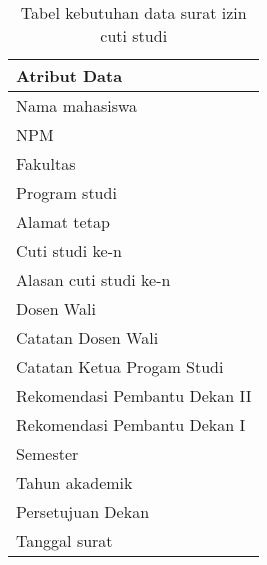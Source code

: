 \begin{table}[H]
\centering
\caption{Tabel kebutuhan data surat izin cuti studi}
\label{surat_izin_cuti_studi}
\begin{tabular}{|l|}
\hline
{\textbf{Atribut Data}}                     \\ \hline
Nama mahasiswa                            \\ \hline 
NPM                                       \\ \hline 
Fakultas                                  \\ \hline 
Program studi                             \\ \hline 
Alamat tetap                              \\ \hline
Cuti studi ke-n   			            \\ \hline 
Alasan cuti studi ke-n                    \\ \hline
Dosen Wali				                \\ \hline 
Catatan Dosen Wali                        \\ \hline
Catatan Ketua Progam Studi                \\ \hline 
Rekomendasi Pembantu Dekan II             \\ \hline 
Rekomendasi Pembantu Dekan I              \\ \hline 
Semester                          		\\ \hline 
Tahun akademik                            \\ \hline
Persetujuan Dekan                         \\ \hline 
Tanggal surat                             \\ \hline
\end{tabular}
\end{table}

